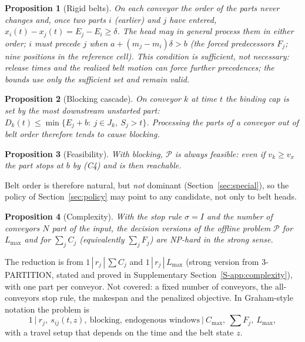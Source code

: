 \documentclass[11pt,a4paper]{article}
\theoremstyle{plain}
\newtheorem{proposition}{Proposition}
\theoremstyle{definition}
\theoremstyle{remark}
\newcommand{\Pb}{\mathcal{P}}
\newcommand{\Supp}[1]{Supplementary Section~\ref{S-#1}}
\begin{document}
\begin{proposition}[Rigid belts]\label{prop:rigid}
On each conveyor the order of the parts never changes and, once two parts $i$ (earlier)
and $j$ have entered, $x_i(t)-x_j(t)=E_j-E_i\ge\delta$. The head may in general process them
in either order; $i$ must precede $j$ when $a+(m_j-m_i)\delta>b$ (the forced predecessors
$F_j$; nine positions in the reference cell). This condition is sufficient, not necessary:
release times and the realized belt motion can force further precedences; the bounds use
only the sufficient set and remain valid.
\end{proposition}
\begin{proposition}[Blocking cascade]\label{prop:cascade}
On conveyor $k$ at time $t$ the binding cap is set by the most downstream unstarted part:
$D_k(t)\le\min\{E_j+b:\ j\in J_k,\ S_j>t\}$. Processing the parts of a conveyor out of belt
order therefore tends to cause blocking.
\end{proposition}
\begin{proposition}[Feasibility]\label{prop:feasible}
With blocking, $\Pb$ is always feasible: even if $v_k\ge v_x$ the part stops at $b$ by (C4)
and is then reachable.
\end{proposition}
Belt order is therefore natural, but \emph{not} dominant (Section~\ref{sec:special}), so the
policy of Section~\ref{sec:policy} may point to any candidate, not only to belt heads.

\begin{proposition}[Complexity]\label{prop:complexity}
With the stop rule $\sigma=I$ and the number of conveyors $N$ part of the input, the
decision versions of the offline problem $\Pb$ for $L_{\max}$ and for $\sum_jC_j$
(equivalently $\sum_jF_j$) are NP-hard in the strong sense.
\end{proposition}
The reduction is from $1\,|\,r_j\,|\,\sum C_j$ \cite{Lenstra1977} and
$1\,|\,r_j\,|\,L_{\max}$ (strong version from 3-PARTITION, stated and proved in
\Supp{app:complexity}), with one part per conveyor. Not covered: a fixed number of
conveyors, the all-conveyors stop rule, the makespan and the penalized objective. In
Graham-style notation the problem is
\[
1\ \big|\ r_j,\ s_{ij}(t,z),\ \text{blocking},\ \text{endogenous windows}\ \big|\ C_{\max},\ \textstyle\sum F_j,\ L_{\max},
\]
with a travel setup that depends on the time and the belt state $z$.
\end{document}
